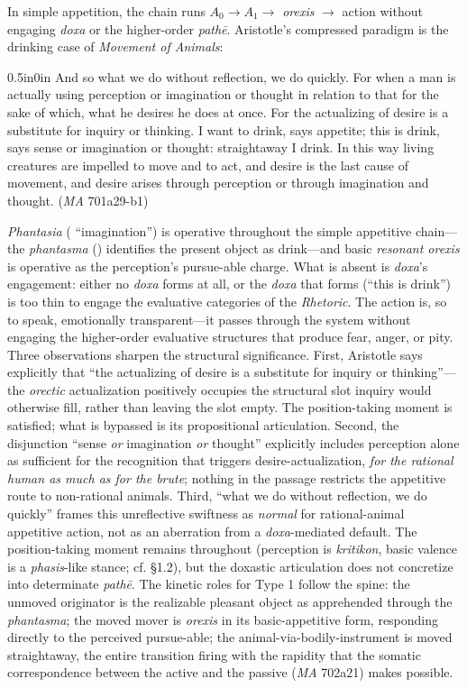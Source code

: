 In simple appetition, the chain runs $A_0 \rightarrow A_1 \rightarrow$ \textit{orexis} $\rightarrow$ action without engaging \textit{doxa} or the higher-order \textit{pathē}. Aristotle's compressed paradigm is the drinking case of \textit{Movement of Animals}:
\begin{adjustwidth}{0.5in}{0in}
And so what we do without reflection, we do quickly. For when a man is actually using perception or imagination or thought in relation to that for the sake of which, what he desires he does at once. For the actualizing of desire is a substitute for inquiry or thinking. I want to drink, says appetite; this is drink, says sense or imagination or thought: straightaway I drink. In this way living creatures are impelled to move and to act, and desire is the last cause of movement, and desire arises through perception or through imagination and thought. (\textit{MA} 701a29-b1)
\end{adjustwidth}
\textit{Phantasia} ( ``imagination'') is operative throughout the simple appetitive chain---the \textit{phantasma} () identifies the present object as drink---and basic \textit{resonant orexis} is operative as the perception's pursue-able charge. What is absent is \textit{doxa}'s engagement: either no \textit{doxa} forms at all, or the \textit{doxa} that forms (``this is drink'') is too thin to engage the evaluative categories of the \textit{Rhetoric}. The action is, so to speak, emotionally transparent---it passes through the system without engaging the higher-order evaluative structures that produce fear, anger, or pity. Three observations sharpen the structural significance. First, Aristotle says explicitly that ``the actualizing of desire is a substitute for inquiry or thinking''---the \textit{orectic} actualization positively occupies the structural slot inquiry would otherwise fill, rather than leaving the slot empty. The position-taking moment is satisfied; what is bypassed is its propositional articulation. Second, the disjunction ``sense \textit{or} imagination \textit{or} thought'' explicitly includes perception alone as sufficient for the recognition that triggers desire-actualization, \textit{for the rational human as much as for the brute}; nothing in the passage restricts the appetitive route to non-rational animals. Third, ``what we do without reflection, we do quickly'' frames this unreflective swiftness as \textit{normal} for rational-animal appetitive action, not as an aberration from a \textit{doxa}-mediated default. The position-taking moment remains throughout (perception is \textit{kritikon}, basic valence is a \textit{phasis}-like stance; cf. \S 1.2), but the doxastic articulation does not concretize into determinate \textit{pathē}. The kinetic roles for Type 1 follow the spine: the unmoved originator is the realizable pleasant object as apprehended through the \textit{phantasma}; the moved mover is \textit{orexis} in its basic-appetitive form, responding directly to the perceived pursue-able; the animal-via-bodily-instrument is moved straightaway, the entire transition firing with the rapidity that the somatic correspondence between the active and the passive (\textit{MA} 702a21) makes possible.

